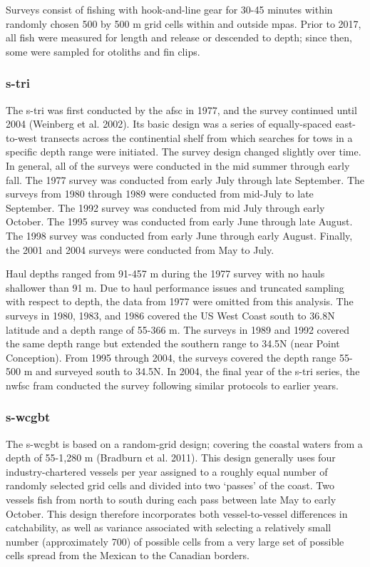 \documentclass[11pt,
  english,
  letterpaper,
]{article}
\begin{document}
Surveys consist of fishing with hook-and-line gear for 30-45 minutes within randomly chosen 500 by 500 m grid cells within and outside \glspl{mpa}. Prior to 2017, all fish were measured for length and release or descended to depth; since then, some were sampled for otoliths and fin clips.

\hypertarget{section-2}{%
\subsubsection{\texorpdfstring{\acrlong{s-tri}}{}}\label{section-2}}

The \gls{s-tri} was first conducted by the \gls{afsc} in 1977, and the survey continued until 2004 (Weinberg et al. 2002). Its basic design was a series of equally-spaced east-to-west transects across the continential shelf from which searches for tows in a specific depth range were initiated. The survey design changed slightly over time. In general, all of the surveys were conducted in the mid summer through early fall. The 1977 survey was conducted from early July through late September. The surveys from 1980 through 1989 were conducted from mid-July to late September. The 1992 survey was conducted from mid July through early October. The 1995 survey was conducted from early June through late August. The 1998 survey was conducted from early June through early August. Finally, the 2001 and 2004 surveys were conducted from May to July.

Haul depths ranged from 91-457 m during the 1977 survey with no hauls shallower than 91 m. Due to haul performance issues and truncated sampling with respect to depth, the data from 1977 were omitted from this analysis. The surveys in 1980, 1983, and 1986 covered the US West Coast south to 36.8\textdegree N latitude and a depth range of 55-366 m. The surveys in 1989 and 1992 covered the same depth range but extended the southern range to 34.5\textdegree N (near Point Conception). From 1995 through 2004, the surveys covered the depth range 55-500 m and surveyed south to 34.5\textdegree N. In 2004, the final year of the \gls{s-tri} series, the \gls{nwfsc} \gls{fram} conducted the survey following similar protocols to earlier years.

\hypertarget{section-3}{%
\subsubsection{\texorpdfstring{\acrlong{s-wcgbt}}{}}\label{section-3}}

The \Gls{s-wcgbt} is based on a random-grid design; covering the coastal waters from a depth of 55-1,280 m (Bradburn et al. 2011). This design generally uses four industry-chartered vessels per year assigned to a roughly equal number of randomly selected grid cells and divided into two `passes' of the coast. Two vessels fish from north to south during each pass between late May to early October. This design therefore incorporates both vessel-to-vessel differences in catchability, as well as variance associated with selecting a relatively small number (approximately 700) of possible cells from a very large set of possible cells spread from the Mexican to the Canadian borders.
\end{document}
